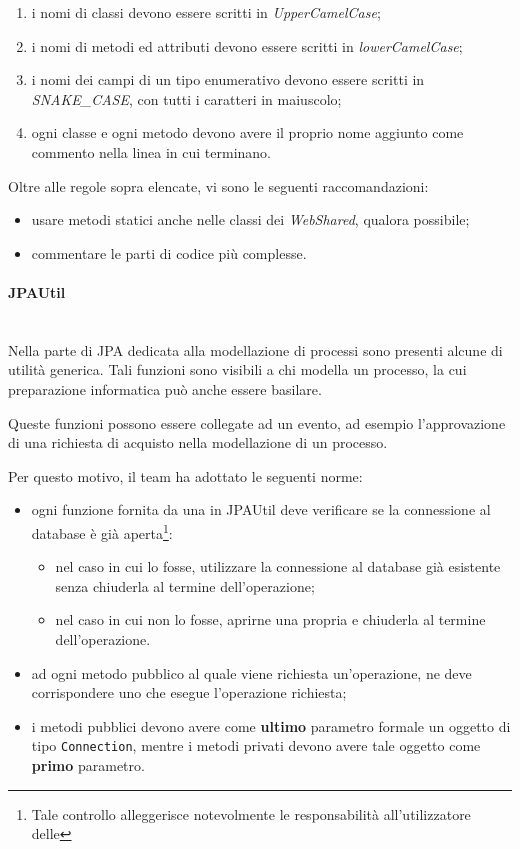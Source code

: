 \begin{itemize}
\begin{enumerate}
		\item i nomi di classi devono essere scritti in \emph{UpperCamelCase};
		\item i nomi di metodi ed attributi devono essere scritti in
		\emph{lowerCamelCase};
		\item i nomi dei campi di un tipo enumerativo devono essere scritti in
		\emph{SNAKE\_CASE}, con tutti i caratteri in maiuscolo;
		\item ogni classe e ogni metodo devono avere il proprio nome aggiunto come
		commento nella linea in cui terminano.
	\end{enumerate}
\end{itemize}

Oltre alle regole sopra elencate, vi sono le seguenti raccomandazioni:

\begin{itemize}
	\item usare metodi statici anche nelle classi dei \emph{WebShared}, qualora
	possibile;
	\item commentare le parti di codice più complesse.
\end{itemize}

\paragraph{JPAUtil} \mbox{} \\

Nella parte di JPA dedicata alla modellazione di processi sono presenti
alcune  di utilità generica. Tali funzioni sono visibili a chi modella
un processo, la cui preparazione informatica può anche essere basilare.

Queste funzioni possono essere collegate ad un evento, ad esempio
l'approvazione di una richiesta di acquisto nella modellazione di un processo.

Per questo motivo, il team ha adottato le seguenti norme:

\begin{itemize}
	\item ogni funzione fornita da una  in JPAUtil deve verificare se
	la connessione al database è già aperta\footnote{Tale controllo alleggerisce
	notevolmente le responsabilità all'utilizzatore delle }:
	\begin{itemize}
		\item nel caso in cui lo fosse, utilizzare la connessione al database già
		esistente senza chiuderla al termine dell'operazione;
		\item nel caso in cui non lo fosse, aprirne una propria e chiuderla al
		termine dell'operazione.
	\end{itemize}
	\item ad ogni metodo pubblico al quale viene richiesta un'operazione, ne deve
	corrispondere uno che esegue l'operazione richiesta;
	\item i metodi pubblici devono avere come \textbf{ultimo} parametro formale
	un oggetto di tipo \texttt{Connection}, mentre i metodi privati devono avere
	tale oggetto come \textbf{primo} parametro.
\end{itemize}

